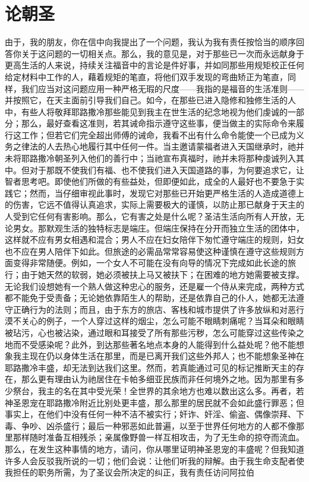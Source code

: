 
\chapter{论朝圣}


由于，我的朋友，你在信中向我提出了一个问题，我认为我有责任按恰当的顺序回答你关于这问题的一切相关点。那么，我的意见是，对于那些已一次而永远献身于更高生活的人来说，持续关注福音中的言论是件好事，并如同那些用规矩校正任何给定材料中工作的人，藉着规矩的笔直，将他们双手发现的弯曲矫正为笔直，同样，我们应当对这问题应用一种严格无瑕的尺度——我指的是福音的生活准则——并按照它，在天主面前引导我们自己。如今，在那些已进入隐修和独修生活的人中，有些人将敬拜耶路撒冷那些能见到我主在世生活的纪念地视为他们虔诚的一部分；那么，最好查看这准则，若其诫命指示遵守这些事，便当做主的实际命令来履行这工作；但若它们完全超出师傅的诫命，我看不出有什么命令能使一个已成为义务之律法的人去热心地履行其中任何一件。当主邀请蒙福者进入天国继承时，祂并未将耶路撒冷朝圣列入他们的善行中；当祂宣布真福时，祂并未将那种虔诚列入其中。但对于那既不使我们有福、也不使我们进入天国道路的事，为何要追求它，让智者思考吧。即使他们所做的有些益处，但即便如此，成全的人最好也不要急于实践它；然而，当仔细审视此事时，发现它对那些已开始更严格生活的人造成道德上的伤害，它远不值得认真追求，实际上需要极大的谨慎，以防止那已献身于天主的人受到它任何有害影响。那么，它有害之处是什么呢？圣洁生活向所有人开放，无论男女。那默观生活的独特标志是端庄。但端庄保持在分开而独立生活的团体中，这样就不应有男女相遇和混合；男人不应在妇女陪伴下匆忙遵守端庄的规则，妇女也不应在男人陪伴下如此。但旅途的必需品常常容易使这种谨慎在遵守这些规则方面变得非常随便。例如，一个女人不可能在没有向导的情况下完成如此长途的旅行；由于她天然的软弱，她必须被扶上马又被扶下；在困难的地方她需要被支撑。无论我们设想她有一个熟人做这种忠心的服务，还是雇一个侍从来完成，两种方式都不能免于受责备；无论她依靠陌生人的帮助，还是依靠自己的仆人，她都无法遵守正确行为的法则；而且，由于东方的旅店、客栈和城市提供了许多放纵和对恶行漠不关心的例子，一个人穿过这样的烟尘，怎么可能不眼睛刺痛呢？当耳朵和眼睛被玷污，心也被沾染，通过眼和耳接受了所有那些污秽，怎么可能穿过这些传染之地而不受感染呢？此外，到达那些著名地点本身的人能得到什么益处呢？他不能想象我主现在仍以身体生活在那里，而是已离开我们这些外邦人；也不能想象圣神在耶路撒冷丰盛，却无法到达我们这里。然而，若真能通过可见的标记推断天主的存在，那么更有理由认为祂居住在卡帕多细亚民族而非任何境外之地。因为那里有多少祭台，我主的名在其中受光荣！全世界的其余地方也难以数出这么多。再者，若神圣恩宠在耶路撒冷附近比别处更丰盛，那么那里的居民就不会如此盛行罪恶；但事实上，在他们中没有任何一种不洁不被实行；奸诈、奸淫、偷盗、偶像崇拜、下毒、争吵、凶杀盛行；最后一种邪恶如此普遍，以至于世界任何地方的人都不像那里那样随时准备互相残杀；亲属像野兽一样互相攻击，为了无生命的掠夺而流血。那么，在发生这种事情的地方，请问，你从哪里证明神圣恩宠的丰盛呢？但我知道许多人会反驳我所说的一切；他们会说：让他们听我的辩解。由于我生命支配者使我担任的职务所需，为了圣议会所决定的纠正，我有责任访问阿拉伯